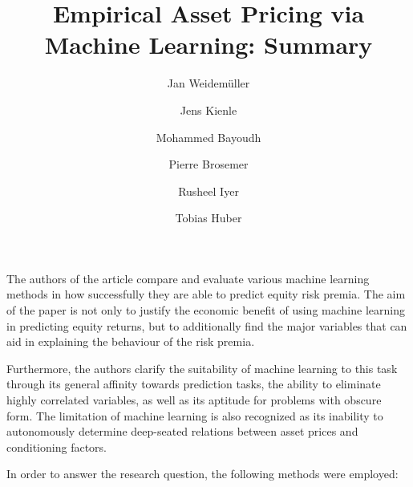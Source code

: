 \documentclass{article}
\date{\displaydate{date}}
\title{Empirical Asset Pricing via Machine Learning: Summary}
\author{Jan Weidemüller \and Jens Kienle \and Mohammed Bayoudh \and Pierre Brosemer \and Rusheel Iyer \and Tobias Huber}
\begin{document}
	
	\maketitle
	\pagebreak
	
	The authors of the article compare and evaluate various machine learning methods in how successfully they are able to predict equity risk premia. The aim of the paper is not only to justify the economic benefit of using machine learning in predicting equity returns, but to additionally find the major variables that can aid in explaining the behaviour of the risk premia.
	
	Furthermore, the authors clarify the suitability of machine learning to this task through its general affinity towards prediction tasks, the ability to eliminate highly correlated variables, as well as its aptitude for problems with obscure form. The limitation of machine learning is also recognized as its inability to autonomously determine deep-seated relations between asset prices and conditioning factors.
	
	In order to answer the research question, the following methods were employed:
\end{document}
